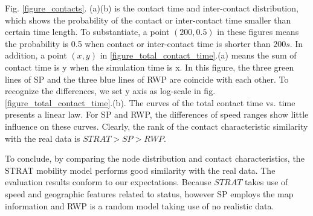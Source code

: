 Fig. \ref{figure_contacts}. (a)(b) is the contact time and inter-contact distribution, which shows the probability of the contact or inter-contact time smaller than certain time length. To substantiate, a point $(200,0.5)$ in these figures means the probability is 0.5 when contact or inter-contact time is shorter than $200s$. In addition, a point $(x,y)$ in \ref{figure_total_contact_time}.(a) means the sum of contact time is y when the simulation time is x. In this figure, the three green lines of SP and the three blue lines of RWP are coincide with each other. To recognize the differences, we set y axis as log-scale in fig.\ref{figure_total_contact_time}.(b).
The curves of the total contact time vs. time presents a linear law. For SP and RWP, the differences of speed ranges show little influence on these curves.
Clearly, the rank of the contact characteristic similarity with the real data is $STRAT>SP>RWP$.

To conclude, by comparing the node distribution and contact characteristics, the STRAT mobility model performs good similarity with the real data. The evaluation results conform to our expectations. Because $STRAT$ takes use of speed and geographic features related to status, however SP employs the map information and RWP is a random model taking use of no realistic data.

